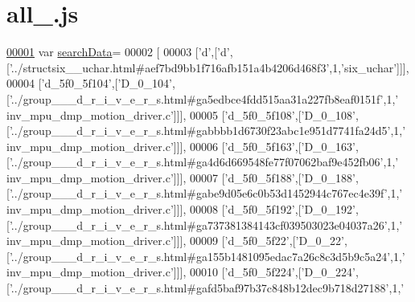 \hypertarget{all__4_8js_source}{}\section{all\+\_.\+js}
\label{all__4_8js_source}

\begin{DoxyCode}
\hypertarget{all__4_8js_source.tex_l00001}{}\hyperlink{all__4_8js_ad01a7523f103d6242ef9b0451861231e}{00001} var \hyperlink{all__4_8js_ad01a7523f103d6242ef9b0451861231e}{searchData}=
00002 [
00003   [\textcolor{charliteral}{'d'},[\textcolor{charliteral}{'d'},[\textcolor{stringliteral}{'../structsix\_\_uchar.html#aef7bd9bb1f716afb151a4b4206d468f3'},1,\textcolor{stringliteral}{'six\_uchar'}]]],
00004   [\textcolor{stringliteral}{'d\_5f0\_5f104'},[\textcolor{stringliteral}{'D\_0\_104'},[\textcolor{stringliteral}{'../group\_\_\_d\_r\_i\_v\_e\_r\_s.html#ga5edbce4fdd515aa31a227fb8eaf0151f'},1,\textcolor{stringliteral}{'
      inv\_mpu\_dmp\_motion\_driver.c'}]]],
00005   [\textcolor{stringliteral}{'d\_5f0\_5f108'},[\textcolor{stringliteral}{'D\_0\_108'},[\textcolor{stringliteral}{'../group\_\_\_d\_r\_i\_v\_e\_r\_s.html#gabbbb1d6730f23abc1e951d7741fa24d5'},1,\textcolor{stringliteral}{'
      inv\_mpu\_dmp\_motion\_driver.c'}]]],
00006   [\textcolor{stringliteral}{'d\_5f0\_5f163'},[\textcolor{stringliteral}{'D\_0\_163'},[\textcolor{stringliteral}{'../group\_\_\_d\_r\_i\_v\_e\_r\_s.html#ga4d6d669548fe77f07062baf9e452fb06'},1,\textcolor{stringliteral}{'
      inv\_mpu\_dmp\_motion\_driver.c'}]]],
00007   [\textcolor{stringliteral}{'d\_5f0\_5f188'},[\textcolor{stringliteral}{'D\_0\_188'},[\textcolor{stringliteral}{'../group\_\_\_d\_r\_i\_v\_e\_r\_s.html#gabe9d05e6c0b53d1452944c767ec4e39f'},1,\textcolor{stringliteral}{'
      inv\_mpu\_dmp\_motion\_driver.c'}]]],
00008   [\textcolor{stringliteral}{'d\_5f0\_5f192'},[\textcolor{stringliteral}{'D\_0\_192'},[\textcolor{stringliteral}{'../group\_\_\_d\_r\_i\_v\_e\_r\_s.html#ga737381384143cf039503023e04037a26'},1,\textcolor{stringliteral}{'
      inv\_mpu\_dmp\_motion\_driver.c'}]]],
00009   [\textcolor{stringliteral}{'d\_5f0\_5f22'},[\textcolor{stringliteral}{'D\_0\_22'},[\textcolor{stringliteral}{'../group\_\_\_d\_r\_i\_v\_e\_r\_s.html#ga155b1481095edac7a26c8c3d5b9c5a24'},1,\textcolor{stringliteral}{'
      inv\_mpu\_dmp\_motion\_driver.c'}]]],
00010   [\textcolor{stringliteral}{'d\_5f0\_5f224'},[\textcolor{stringliteral}{'D\_0\_224'},[\textcolor{stringliteral}{'../group\_\_\_d\_r\_i\_v\_e\_r\_s.html#gafd5baf97b37c848b12dec9b718d27188'},1,\textcolor{stringliteral}{'
}
\end{DoxyCode}
